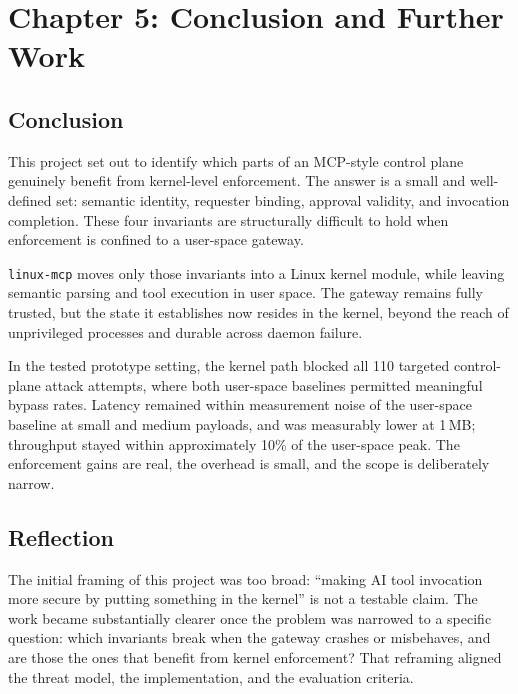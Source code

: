 \section*{Chapter 5: Conclusion and Further Work}
 \label{chap:conclusion} \setcounter{section}{5} \setcounter{subsection}{0}

\subsection{Conclusion}

This project set out to identify which parts of an MCP-style control plane genuinely benefit from kernel-level enforcement.
The answer is a small and well-defined set: semantic identity, requester binding, approval validity, and invocation completion.
These four invariants are structurally difficult to hold when enforcement is confined to a user-space gateway.

\texttt{linux-mcp} moves only those invariants into a Linux kernel module, while leaving semantic parsing and tool execution in user space.
The gateway remains fully trusted, but the state it establishes now resides in the kernel, beyond the reach of unprivileged processes and durable across daemon failure.

In the tested prototype setting, the kernel path blocked all 110 targeted control-plane attack attempts, where both user-space baselines permitted meaningful bypass rates.
Latency remained within measurement noise of the user-space baseline at small and medium payloads, and was measurably lower at 1\,MB; throughput stayed within approximately 10\% of the user-space peak.
The enforcement gains are real, the overhead is small, and the scope is deliberately narrow.

\subsection{Reflection}

The initial framing of this project was too broad: ``making AI tool invocation more secure by putting something in the kernel'' is not a testable claim.
The work became substantially clearer once the problem was narrowed to a specific question: which invariants break when the gateway crashes or misbehaves, and are those the ones that benefit from kernel enforcement?
That reframing aligned the threat model, the implementation, and the evaluation criteria.

